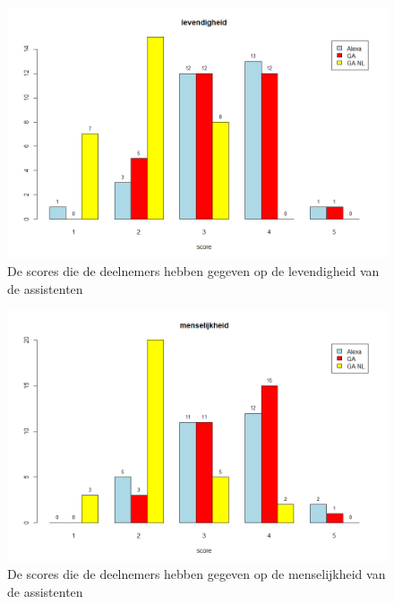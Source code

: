 \begin{figure}[H]
    \centering
    \includegraphics[width=0.9\linewidth]{../onderzoek/onderzoeksresultaten/vergelijking_assistenten_per_eigenschap/barplot/barplot_score_levendigheid}
    \caption{De scores die de deelnemers hebben gegeven op de levendigheid van de assistenten}
    \label{fig:barplot-levendigheid}
\end{figure}

\begin{figure}[H]
    \centering
    \includegraphics[width=0.9\linewidth]{../onderzoek/onderzoeksresultaten/vergelijking_assistenten_per_eigenschap/barplot/barplot_score_menselijkheid}
    \caption{De scores die de deelnemers hebben gegeven op de menselijkheid van de assistenten}
    \label{fig:barplot-menselijkheid}
\end{figure}

